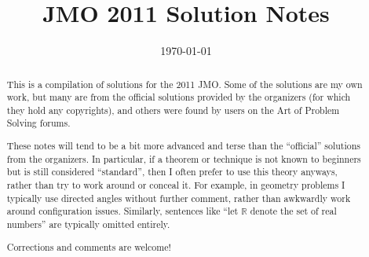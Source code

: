 \documentclass[11pt]{scrartcl}
\title{JMO 2011 Solution Notes}
\date{\today}
\begin{document}
\maketitle

\begin{abstract}
This is a compilation of solutions
for the 2011 JMO.
Some of the solutions are my own work,
but many are from the official solutions provided by the organizers
(for which they hold any copyrights),
and others were found by users on the Art of Problem Solving forums.

These notes will tend to be a bit more advanced and terse than the ``official''
solutions from the organizers.
In particular, if a theorem or technique is not known to beginners
but is still considered ``standard'', then I often prefer to
use this theory anyways, rather than try to work around or conceal it.
For example, in geometry problems I typically use directed angles
without further comment, rather than awkwardly work around configuration issues.
Similarly, sentences like ``let $\mathbb{R}$ denote the set of real numbers''
are typically omitted entirely.

Corrections and comments are welcome!
\end{abstract}

\tableofcontents
\newpage

\addtocounter{section}{-1}
\end{document}
